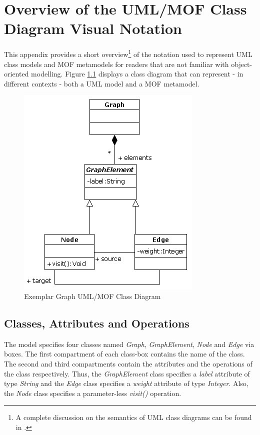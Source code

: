 \chapter{Overview of the UML/MOF Class Diagram Visual Notation}
\label{app:UMLNotation}

This appendix provides a short overview\footnote{A complete discussion on the semantics of UML class diagrams can be found in \cite{Larman}.} of the notation used to represent UML class models and MOF metamodels for readers that are not familiar with object-oriented modelling. Figure \ref{fig:UMLNotation} displays a class diagram that can represent - in different contexts - both a UML model and a MOF metamodel.

\begin{figure}
	\centering
		\includegraphics{images/UMLNotation.png}
	\caption{Exemplar Graph UML/MOF Class Diagram}
	\label{fig:UMLNotation}
\end{figure}

\section{Classes, Attributes and Operations}

The model specifies four classes named \emph{Graph}, \emph{GraphElement}, \emph{Node} and \emph{Edge} via boxes. The first compartment of each class-box contains the name of the class. The second and third compartments contain the attributes and the operations of the class respectively. Thus, the \emph{GraphElement} class specifies a \emph{label} attribute of type \emph{String} and the \emph{Edge} class specifies a \emph{weight} attribute of type \emph{Integer}. Also, the \emph{Node} class specifies a parameter-less \emph{visit()} operation. 

